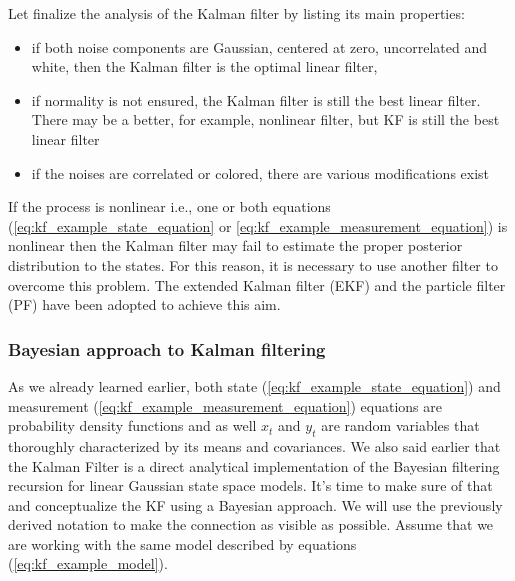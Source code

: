 Let  finalize the analysis of the Kalman filter by listing its main properties:
\begin{itemize}
    \item if both noise components are Gaussian, centered at zero, uncorrelated and white, then the Kalman filter is the optimal linear filter,
    \item if normality is not ensured, the Kalman filter is still the best linear filter. There may be a better, for example, nonlinear filter, but KF is still the best linear filter
    \item if the noises are correlated or colored, there are various modifications exist
\end{itemize}

If the process is nonlinear i.e., one or both equations (\ref{eq:kf_example_state_equation} or \ref{eq:kf_example_measurement_equation}) is nonlinear then the Kalman filter may fail to estimate the proper posterior distribution to the states. For this reason, it is necessary to use another filter to overcome this problem. The extended Kalman filter (EKF) and the particle filter (PF) have been adopted to achieve this aim.

\subsubsection{Bayesian approach to Kalman filtering}
As we already learned earlier, both state (\ref{eq:kf_example_state_equation}) and measurement (\ref{eq:kf_example_measurement_equation}) equations are probability density functions and as well \(x_t\) and \(y_t\) are random variables that thoroughly characterized by its means and covariances. We also said earlier that the Kalman Filter is a direct analytical implementation of  the Bayesian filtering recursion for linear Gaussian state space models. It's time to make sure of that and conceptualize the KF using a Bayesian approach. We will use the previously derived notation to make the connection as visible as possible. Assume that we are working with the same model described by equations (\ref{eq:kf_example_model}).

